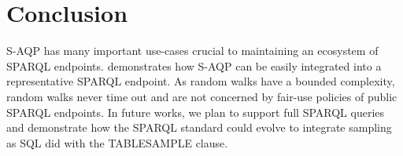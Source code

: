 
\section{Conclusion}

S-AQP has many important use-cases crucial to maintaining an ecosystem of SPARQL endpoints. \NAME demonstrates how S-AQP can be
easily integrated into a representative SPARQL endpoint. As random
walks have a bounded complexity, random walks never time out and are not concerned by fair-use policies of public SPARQL endpoints.  In
future works, we plan to support full SPARQL queries and demonstrate
how the SPARQL standard could evolve to integrate sampling as SQL
did with the TABLESAMPLE clause.
